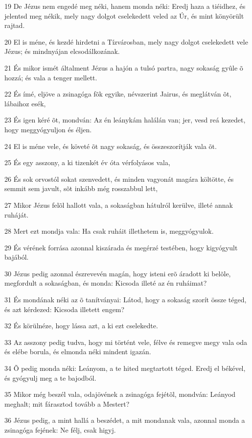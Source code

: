 \par 19 De Jézus nem engedé meg néki, hanem monda néki: Eredj haza a tiéidhez, és jelentsd meg nékik, mely nagy dolgot cselekedett veled az Úr, és mint könyörült rajtad.
\par 20 El is méne, és kezdé hirdetni a Tízvárosban, mely nagy dolgot cselekedett vele Jézus; és mindnyájan elcsodálkozának.
\par 21 És mikor ismét általment Jézus a hajón a tulsó partra, nagy sokaság gyûle õ hozzá; és vala a tenger mellett.
\par 22 És ímé, eljöve a zsinagóga fõk egyike, névszerint Jairus, és meglátván õt, lábaihoz esék,
\par 23 És igen kéré õt, mondván: Az én leánykám halálán van; jer, vesd reá kezedet, hogy meggyógyuljon és éljen.
\par 24 El is méne vele, és követé õt nagy sokaság, és összeszorítják vala õt.
\par 25 És egy asszony, a ki tizenkét év óta vérfolyásos vala,
\par 26 És sok orvostól sokat szenvedett, és minden vagyonát magára költötte, és semmit sem javult, sõt inkább még rosszabbul lett,
\par 27 Mikor Jézus felõl hallott vala, a sokaságban hátulról kerülve, illeté annak ruháját.
\par 28 Mert ezt mondja vala: Ha csak ruháit illethetem is, meggyógyulok.
\par 29 És vérének forrása azonnal kiszárada és megérzé testében, hogy kigyógyult bajából.
\par 30 Jézus pedig azonnal észrevevén magán, hogy isteni erõ áradott ki belõle, megfordult a sokaságban, és monda: Kicsoda illeté az én ruháimat?
\par 31 És mondának néki az õ tanítványai: Látod, hogy a sokaság szorít össze téged, és azt kérdezed: Kicsoda illetett engem?
\par 32 És körülnéze, hogy lássa azt, a ki ezt cselekedte.
\par 33 Az asszony pedig tudva, hogy mi történt vele, félve és remegve megy vala oda és elébe borula, és elmonda néki mindent igazán.
\par 34 Õ pedig monda néki: Leányom, a te hited megtartott téged. Eredj el békével, és gyógyulj meg a te bajodból.
\par 35 Mikor még beszél vala, odajövének a zsinagóga fejétõl, mondván: Leányod meghalt; mit fárasztod tovább a Mestert?
\par 36 Jézus pedig, a mint hallá a beszédet, a mit mondanak vala, azonnal monda a zsinagóga fejének: Ne félj, csak higyj.
